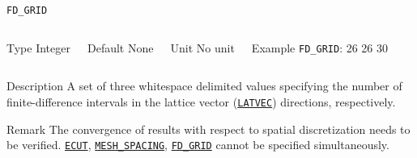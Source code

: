 \begin{frame}[allowframebreaks]{\texttt{FD\_GRID}} \label{FD_GRID}
\vspace*{-12pt}
\begin{columns}
\begin{block}{Type}
Integer
\end{block}

\begin{block}{Default}
None
\end{block}

\begin{block}{Unit}
No unit
\end{block}

\begin{block}{Example}
\texttt{FD\_GRID}: 26 26 30
\end{block}
\end{columns}

\begin{block}{Description}
A set of three whitespace delimited values specifying the number of finite-difference intervals in the lattice vector (\hyperlink{LATVEC}{\texttt{LATVEC}}) directions, respectively.
\end{block}

\begin{block}{Remark}
The convergence of results with respect to spatial discretization needs to be verified. \hyperlink{ECUT}{\texttt{ECUT}}, \hyperlink{MESH_SPACING}{\texttt{MESH\_SPACING}}, \hyperlink{FD_GRID}{\texttt{FD\_GRID}} cannot be specified simultaneously.
\end{block}

\end{frame}




